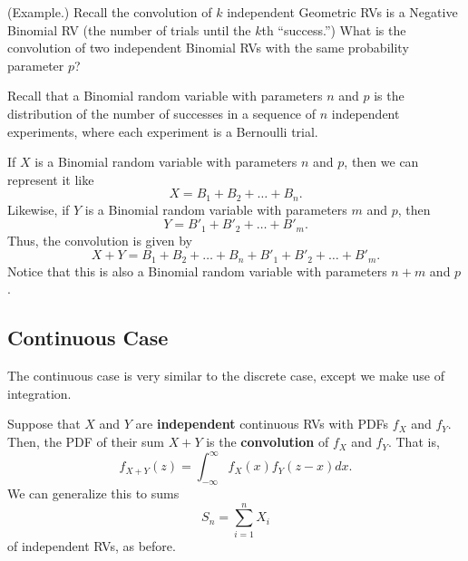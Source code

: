 \documentclass[letterpaper]{article}
\begin{document}
\begin{mdframed}[]
    (Example.) Recall the convolution of $k$ independent Geometric RVs is a Negative Binomial RV (the number of trials until the $k$th ``success.'') What is the convolution of two independent Binomial RVs with the same probability parameter $p$? 

    \begin{mdframed}[]
        Recall that a Binomial random variable with parameters $n$ and $p$ is the distribution of the number of successes in a sequence of $n$ independent experiments, where each experiment is a Bernoulli trial. 

        \bigskip 

        If $X$ is a Binomial random variable with parameters $n$ and $p$, then we can represent it like 
        \[X = B_1 + B_2 + \dots + B_n.\]
        Likewise, if $Y$ is a Binomial random variable with parameters $m$ and $p$, then 
        \[Y = B'_1 + B'_2 + \dots + B'_m.\]
        Thus, the convolution is given by 
        \[X + Y = B_1 + B_2 + \dots + B_n + B'_1 + B'_2 + \dots + B'_m.\]
        Notice that this is also a Binomial random variable with parameters $n + m$ and $p$.
    \end{mdframed}
\end{mdframed}

\subsection{Continuous Case}
The continuous case is very similar to the discrete case, except we make use of integration. 

\begin{theorem}{}{}
    Suppose that $X$ and $Y$ are \textbf{independent} continuous RVs with PDFs $f_X$ and $f_Y$. Then, the PDF of their sum $X + Y$ is the \textbf{convolution} of $f_X$ and $f_Y$. That is, 
    \[f_{X + Y}(z) = \int_{-\infty}^{\infty} f_{X}(x) f_{Y}(z - x) dx.\]
    We can generalize this to sums 
    \[S_n = \sum_{i = 1}^{n} X_i\]
    of independent RVs, as before.
\end{theorem}
\end{document}
